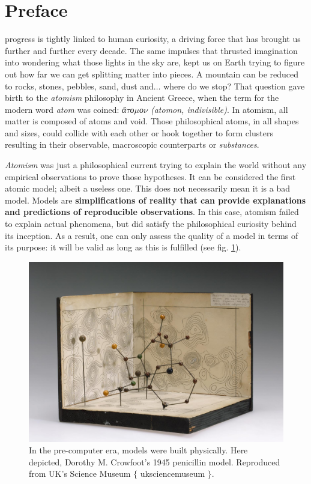 
\chapter*{Preface}
\label{chap:preface}

 progress is tightly linked to human curiosity, a driving force that has brought us further and further every decade. The same impulses that thrusted imagination into wondering what those lights in the sky are, kept us on Earth trying to figure out how far we can get splitting matter into pieces. A mountain can be reduced to rocks, stones, pebbles, sand, dust and$ \ldots $  where do we stop? That question gave birth to the \textit{atomism} philosophy in Ancient Greece, when the term for the modern word \textit{atom} was coined: \textit{ἄ$\tau$ο$\mu$ο$\nu$ (atomon, indivisible)}. In atomism, all matter is composed of atoms and void. Those philosophical atoms, in all shapes and sizes, could collide with each other or hook together to form clusters resulting in their observable, macroscopic counterparts or \textit{substances}.

\textit{Atomism} was just a philosophical current trying to explain the world without any empirical observations to prove those hypotheses. It can be considered the first atomic model; albeit a useless one. This does not necessarily mean it is a bad model. Models are \textbf{simplifications of reality that can provide explanations and predictions of reproducible observations}. In this case, atomism failed to explain actual phenomena, but did satisfy the philosophical curiosity behind its inception. As a result, one can only assess the quality of a model in terms of its purpose: it will be valid as long as this is fulfilled (see fig. \ref{fig:penicillin}).



\begin{figure}[H]
	\includegraphics[width=\textwidth]{./figures/01/penicillin.jpg}
	\caption[Dorothy M. Crowfoot's 1945 Penicillin model]{In the pre-computer era, models were built physically. Here depicted, Dorothy M. Crowfoot's 1945 penicillin model. Reproduced from UK's Science Museum $ \{ $ uksciencemuseum $ \} $.}
	\label{fig:penicillin}
\end{figure}


